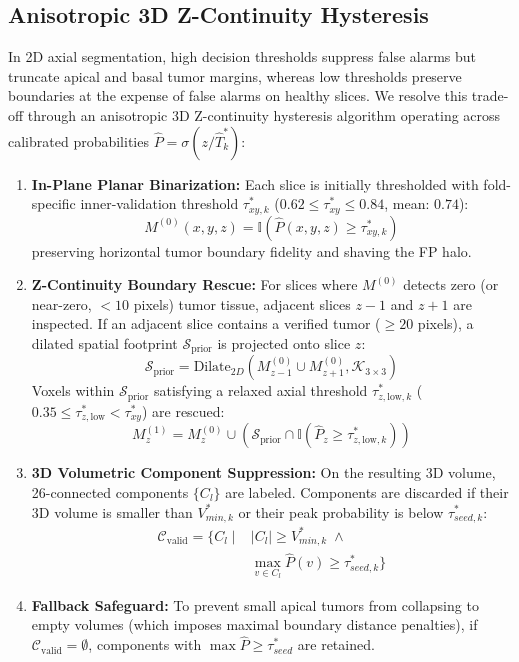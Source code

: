 \documentclass[preprint,3p,times,onecolumn]{elsarticle}
\begin{document}
\subsection{Anisotropic 3D Z-Continuity Hysteresis}
In 2D axial segmentation, high decision thresholds suppress false alarms but truncate apical and basal tumor margins, whereas low thresholds preserve boundaries at the expense of false alarms on healthy slices. We resolve this trade-off through an anisotropic 3D Z-continuity hysteresis algorithm operating across calibrated probabilities $\hat{P} = \sigma(z / \hat{T}_k^*)$:
\begin{enumerate}
    \item \textbf{In-Plane Planar Binarization:} Each slice is initially thresholded with fold-specific inner-validation threshold $\tau_{xy, k}^*$ ($0.62 \le \tau_{xy}^* \le 0.84$, mean: $0.74$):
    \begin{equation}
    M^{(0)}(x, y, z) = \mathbb{I}\left( \hat{P}(x, y, z) \ge \tau_{xy, k}^* \right)
    \end{equation}
    preserving horizontal tumor boundary fidelity and shaving the FP halo.
    \item \textbf{Z-Continuity Boundary Rescue:} For slices where $M^{(0)}$ detects zero (or near-zero, $< 10$ pixels) tumor tissue, adjacent slices $z-1$ and $z+1$ are inspected. If an adjacent slice contains a verified tumor ($\ge 20$ pixels), a dilated spatial footprint $\mathcal{S}_{\text{prior}}$ is projected onto slice $z$:
    \begin{equation}
    \mathcal{S}_{\text{prior}} = \text{Dilate}_{2D}\left(M^{(0)}_{z-1} \cup M^{(0)}_{z+1}, \mathcal{K}_{3\times 3}\right)
    \end{equation}
    Voxels within $\mathcal{S}_{\text{prior}}$ satisfying a relaxed axial threshold $\tau_{z,\mathrm{low}, k}^*$ ($0.35 \le \tau_{z,\mathrm{low}}^* < \tau_{xy}^*$) are rescued:
    \begin{equation}
    M^{(1)}_z = M^{(0)}_z \cup \left( \mathcal{S}_{\text{prior}} \cap \mathbb{I}(\hat{P}_z \ge \tau_{z,\mathrm{low}, k}^*) \right)
    \end{equation}
    \item \textbf{3D Volumetric Component Suppression:} On the resulting 3D volume, 26-connected components $\{C_l\}$ are labeled. Components are discarded if their 3D volume is smaller than $V_{min, k}^*$ or their peak probability is below $\tau_{seed, k}^*$:
    \begin{equation}
    \begin{aligned}
    \mathcal{C}_{\text{valid}} = \big\{ C_l \mid &|C_l| \ge V_{min, k}^* \;\land \\
    &\max_{v \in C_l} \hat{P}(v) \ge \tau_{seed, k}^* \big\}
    \end{aligned}
    \end{equation}
    \item \textbf{Fallback Safeguard:} To prevent small apical tumors from collapsing to empty volumes (which imposes maximal boundary distance penalties), if $\mathcal{C}_{\text{valid}} = \emptyset$, components with $\max \hat{P} \ge \tau_{seed}^*$ are retained.
\end{enumerate}
\end{document}
